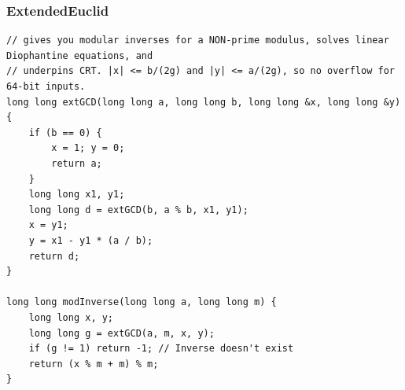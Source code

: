 \documentclass[9pt,a4paper,twocolumn]{extarticle}
\begin{document}
\filbreak
\subsubsection{ExtendedEuclid}
\nopagebreak
\begin{lstlisting}
// gives you modular inverses for a NON-prime modulus, solves linear Diophantine equations, and
// underpins CRT. |x| <= b/(2g) and |y| <= a/(2g), so no overflow for 64-bit inputs.
long long extGCD(long long a, long long b, long long &x, long long &y) {
    if (b == 0) {
        x = 1; y = 0;
        return a;
    }
    long long x1, y1;
    long long d = extGCD(b, a % b, x1, y1);
    x = y1;
    y = x1 - y1 * (a / b);
    return d;
}

long long modInverse(long long a, long long m) {
    long long x, y;
    long long g = extGCD(a, m, x, y);
    if (g != 1) return -1; // Inverse doesn't exist
    return (x % m + m) % m;
}
\end{lstlisting}

\filbreak
\end{document}
